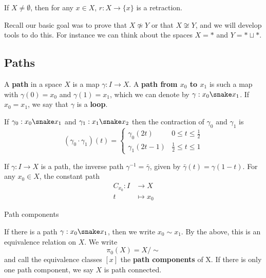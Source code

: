 \documentclass{article}
\numberwithin{nthm}{subsection}
\begin{document}
\begin{eg}
    If $X \neq \emptyset$, then for any $x \in X$, $r: X \to \{x\}$ is a retraction.
\end{eg}

Recall our basic goal was to prove that $X \not\simeq Y$ or that $X \not \cong Y$, and we will develop tools to do this.  For instance we can think about the spaces $X = *$ and $Y = * \sqcup *$.

\subsection{Paths}

\begin{ndef}
    A \textbf{path} in a space $X$ is a map $\gamma: I \to X$.
    A \textbf{path from $x_0$ to $x_1$} is such a map with $\gamma(0) = x_0$ and $\gamma(1) = x_1$, which we can denote by $\gamma: x_0 \snake x_1$.
    If $x_0 = x_1$, we say that $\gamma$ is a \textbf{loop}.
\end{ndef}

If $\gamma_0: x_0 \snake x_1$ and $\gamma_1: x_1 \snake x_2$ then the contraction of $\gamma_0$ and $\gamma_1$ is
\begin{equation*}
    (\gamma_0 \cdot \gamma_1) (t) =
    \begin{cases}
        \gamma_0(2t) & 0 \leq t \leq \frac12 \\
        \gamma_1(2t-1) & \frac12 \leq t \leq 1
    \end{cases}
\end{equation*}

If $\gamma: I \to X$ is a path, the inverse path $\gamma^{-1} = \bar{\gamma}$, given by $\bar{\gamma}(t) = \gamma(1-t)$.
For any $x_0 \in X$, the constant path
\begin{align*}
    C_{x_0}: I &\to X \\
             t &\mapsto x_0
\end{align*}

\begin{ndef}\hypertarget{def:pathComp}{Path components}
    If there is a path $\gamma:x_0 \snake x_1$, then we write $x_0 \sim x_1$.  By the above, this is an equivalence relation on $X$.  We write
    \begin{equation*}
        \pi_0(X) = X/\sim
    \end{equation*}
    and call the equivalence classes $[x]$ the \textbf{path components} of X.
    If there is only one path component, we say $X$ is path connected.
\end{ndef}
\end{document}
